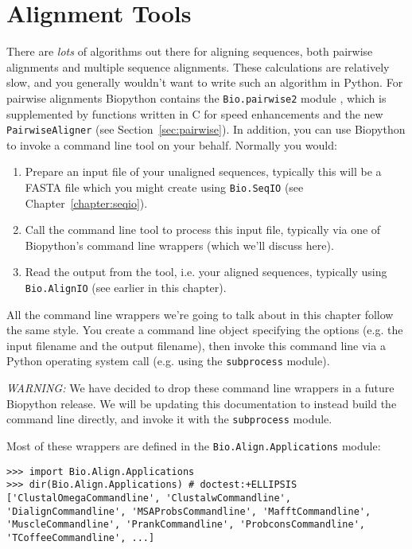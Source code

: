 \section{Alignment Tools}
\label{sec:alignment-tools}

There are \emph{lots} of algorithms out there for aligning sequences, both pairwise alignments
and multiple sequence alignments. These calculations are relatively slow, and you generally
wouldn't want to write such an algorithm in Python. For pairwise alignments Biopython contains
the \verb|Bio.pairwise2| module , which is supplemented by functions written in C for speed
enhancements and the new \verb|PairwiseAligner| (see Section~\ref{sec:pairwise}). In addition,
you can use Biopython to invoke a command line tool on your behalf. Normally you would:
\begin{enumerate}
\item Prepare an input file of your unaligned sequences, typically this will be a FASTA file
      which you might create using \verb|Bio.SeqIO| (see Chapter~\ref{chapter:seqio}).
\item Call the command line tool to process this input file, typically via one of Biopython's
      command line wrappers (which we'll discuss here).
\item Read the output from the tool, i.e. your aligned sequences, typically using
      \verb|Bio.AlignIO| (see earlier in this chapter).
\end{enumerate}

All the command line wrappers we're going to talk about in this chapter follow the same style.
You create a command line object specifying the options (e.g. the input filename and the
output filename), then invoke this command line via a Python operating system call (e.g.
using the \texttt{subprocess} module).

\emph{WARNING:} We have decided to drop these command line wrappers in a future Biopython
release. We will be updating this documentation to instead build the command line
directly, and invoke it with the \texttt{subprocess} module.

Most of these wrappers are defined in the \verb|Bio.Align.Applications| module:

\begin{verbatim}
>>> import Bio.Align.Applications
>>> dir(Bio.Align.Applications) # doctest:+ELLIPSIS
['ClustalOmegaCommandline', 'ClustalwCommandline', 'DialignCommandline', 'MSAProbsCommandline', 'MafftCommandline', 'MuscleCommandline', 'PrankCommandline', 'ProbconsCommandline', 'TCoffeeCommandline', ...]
\end{verbatim}

